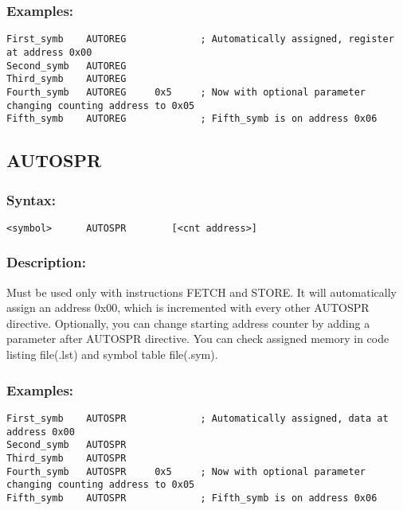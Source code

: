         \subsubsection{Examples:}
            {
                \usecodefont
                \verb'First_symb    AUTOREG             ; Automatically assigned, register at address 0x00'\\
                \verb'Second_symb   AUTOREG'\\
                \verb'Third_symb    AUTOREG'\\
                \verb'Fourth_symb   AUTOREG     0x5     ; Now with optional parameter changing counting address to 0x05'\\
                \verb'Fifth_symb    AUTOREG             ; Fifth_symb is on address 0x06'\\
            }

    \subsection{AUTOSPR}
        \subsubsection{Syntax:}
            {
                \usecodefont
                \verb'<symbol>      AUTOSPR        [<cnt address>]'
            }

    \subsubsection{Description:}
        Must be used only with instructions FETCH and STORE. It will automatically assign an address 0x00, which is incremented with every other AUTOSPR directive. Optionally, you can change starting address counter by adding a parameter after AUTOSPR directive. You can check assigned memory in code listing file(.lst) and symbol table file(.sym).

    \subsubsection{Examples:}
        {
            \usecodefont
            \verb'First_symb    AUTOSPR             ; Automatically assigned, data at address 0x00'\\
            \verb'Second_symb   AUTOSPR'\\
            \verb'Third_symb    AUTOSPR'\\
            \verb'Fourth_symb   AUTOSPR     0x5     ; Now with optional parameter changing counting address to 0x05'\\
            \verb'Fifth_symb    AUTOSPR             ; Fifth_symb is on address 0x06'\\
        }

